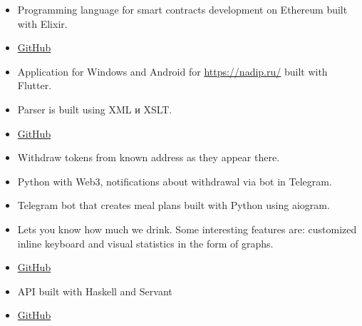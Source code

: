 \documentclass[10pt,a4paper,ragged2e]{altacv}
\begin{document}
\begin{itemize}
  \item Programming language for smart contracts development on Ethereum built with Elixir.
  \item \href{https://github.com/sl1depengwyn/elixireum}{GitHub}
\end{itemize}
\smallskip
{}
\begin{itemize}
  \item Application for Windows and Android for \newline \url{https://nadip.ru/} built with Flutter.
\end{itemize}
\smallskip
{}
\begin{itemize}
  \item Parser is built using XML и XSLT.
  \item \href{https://github.com/YeslieSnayder/eo}{GitHub}
\end{itemize}
\smallskip
{}
\begin{itemize}
  \item Withdraw tokens from known address as they appear there.
  \item Python with Web3, notifications about withdrawal via bot in Telegram.
\end{itemize}
\smallskip
{}
\begin{itemize}
  \item Telegram bot that creates meal plans built with Python using aiogram.
\end{itemize}
\smallskip
{}
\begin{itemize}
  \item Lets you know how much we drink. Some interesting features are: customized inline keyboard and visual statistics in the form of graphs.
  \item \href{https://github.com/sl1depengwyn/drink-bot}{GitHub}
\end{itemize}
\smallskip
{}
\begin{itemize}
  \item API built with Haskell and Servant
  \item \href{https://github.com/sl1depengwyn/drink-bot-api}{GitHub}
\end{itemize}
\end{document}
